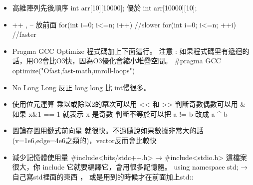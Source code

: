 \begin{itemize}
\item 高維陣列先後順序
int arr[10][10000]; 優於 int arr[10000][10];

\item ++ , -- 放前面
for(int i=0; i<=n; i++)   //slower
for(int i=0; i<=n; ++i)   //faster

\item Pragma GCC Optimize
程式碼加上下面這行。
注意 : 如果程式碼里有遞迴的話，用O2會比O3快，因為O3優化會縮小堆疊空間。
#pragma GCC optimize("Ofast,fast-math,unroll-loops")

\item No Long Long
反正 long long 比 int慢很多。

\item 使用位元運算
乘以或除以2的冪次可以用 << 和 >>
判斷奇數偶數可以用 & 如果 x&1 == 1 就表示 x 是奇數
判斷不等於可以把 a != b 改成 a ^ b

\item 圖論存圖用鏈式前向星
就很快。不過聽說如果數據非常大的話(v=1e6,edge=4e6之類的)，vector反而會比較快

\item 減少記憶體使用量
#include<bits/stdc++.h> → #include<stdio.h>
這檔案很大，你 include 它就要編譯它，會用很多記憶體。
using namespace std; → 自己寫std裡面的東西 ， 或是用到的時候才在前面加上std::
\end{itemize}
